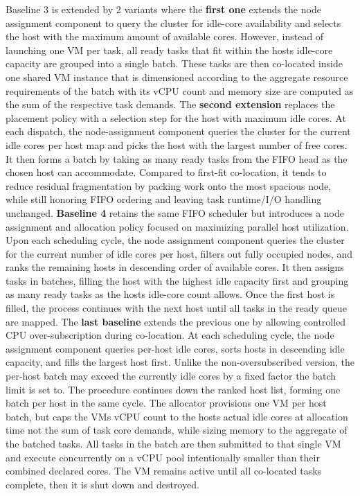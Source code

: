 Baseline 3 is extended by 2 variants where the \textbf{first one} extends the node assignment component to query the cluster for idle-core availability and selects the host with the maximum amount of available cores. However, instead of launching one VM per task, all ready tasks that fit within the hosts idle-core capacity are grouped into a single batch. These tasks are then co-located inside one shared VM instance that is dimensioned according to the aggregate resource requirements of the batch with its vCPU count and memory size are computed as the sum of the respective task demands.
The \textbf{second extension} replaces the placement policy with a selection step for the host with maximum idle cores. At each dispatch, the node-assignment component queries the cluster for the current idle cores per host map and picks the host with the largest number of free cores. It then forms a batch by taking as many ready tasks from the FIFO head as the chosen host can accommodate. Compared to first-fit co-location, it tends to reduce residual fragmentation by packing work onto the most spacious node, while still honoring FIFO ordering and leaving task runtime/I/O handling unchanged.
\textbf{Baseline 4} retains the same FIFO scheduler but introduces a node assignment and allocation policy focused on maximizing parallel host utilization. Upon each scheduling cycle, the node assignment component queries the cluster for the current number of idle cores per host, filters out fully occupied nodes, and ranks the remaining hosts in descending order of available cores. It then assigns tasks in batches, filling the host with the highest idle capacity first and grouping as many ready tasks as the hosts idle-core count allows. Once the first host is filled, the process continues with the next host until all tasks in the ready queue are mapped.
The \textbf{last baseline} extends the previous one by allowing controlled CPU over-subscription during co-location.
At each scheduling cycle, the node assignment component queries per-host idle cores, sorts hosts in descending idle capacity, and fills the largest host first. Unlike the non-oversubscribed version, the per-host batch may exceed the currently idle cores by a fixed factor the batch limit is set to. The procedure continues down the ranked host list, forming one batch per host in the same cycle.
The allocator provisions one VM per host batch, but caps the VMs vCPU count to the hosts actual idle cores at allocation time not the sum of task core demands, while sizing memory to the aggregate of the batched tasks. All tasks in the batch are then submitted to that single VM and execute concurrently on a vCPU pool intentionally smaller than their combined declared cores. The VM remains active until all co-located tasks complete, then it is shut down and destroyed.
